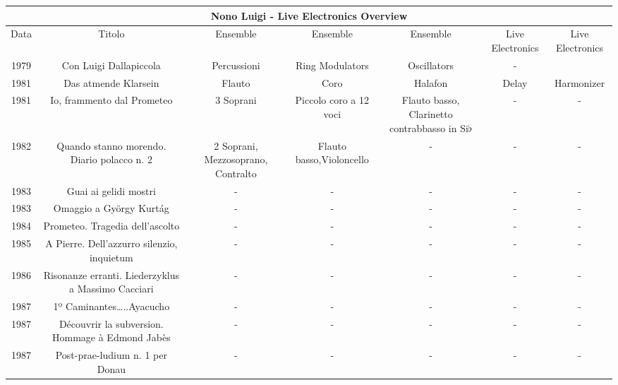\documentclass{article}
\begin{document}
\begin{tabular}{ |c|c|c|c|c|c|c|}
\hline
\multicolumn{7}{|c|}{Nono Luigi - Live Electronics Overview} \\
\hline
Data& Titolo& Ensemble& Ensemble&  Ensemble& Live Electronics &Live Electronics\\
\hline
1979 & Con Luigi Dallapiccola& Percussioni  & Ring Modulators &Oscillators &-&  \\
1981 & Das atmende Klarsein &Flauto & Coro & Halafon &Delay &Harmonizer \\
1981 & Io, frammento dal Prometeo&3 Soprani&Piccolo coro a 12 voci&Flauto basso, Clarinetto contrabbasso in Si$\flat$&-&-\\
1982 & Quando stanno morendo. Diario polacco n. 2&2 Soprani, Mezzosoprano, Contralto&Flauto basso,Violoncello&-&-&- \\
1983 &Guai ai gelidi mostri &-&-&-&-&- \\
1983 &Omaggio a György Kurtág &-&-&-&-&- \\
1984 &Prometeo. Tragedia dell’ascolto &-&-&-&-&- \\
1985 &A Pierre. Dell’azzurro silenzio, inquietum &-&-&-&-&- \\
1986 &Risonanze erranti. Liederzyklus a Massimo Cacciari &-&-&-&-&-\\
1987 &1º Caminantes…..Ayacucho&-&-&-&-&- \\
1987 &Découvrir la subversion. Hommage à Edmond Jabès &-&-&-&-&- \\
1987 &Post-prae-ludium n. 1 per Donau &-&-&-&-&- \\
\hline
\end{tabular}
\end{document}
